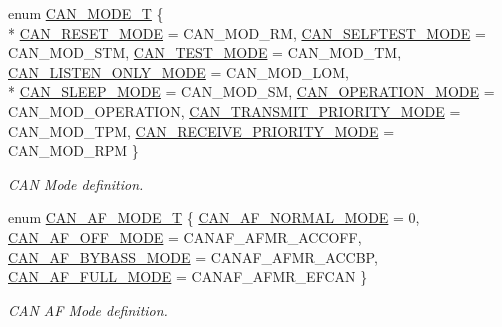 \begin{DoxyCompactItemize}
enum \hyperlink{group__CAN__17XX__40XX_ga57c03b9f9b4ebf86dccc13baf8c2889c}{C\-A\-N\-\_\-\-M\-O\-D\-E\-\_\-\-T} \{ \\*
\hyperlink{group__CAN__17XX__40XX_gga57c03b9f9b4ebf86dccc13baf8c2889ca398cd9777634ece5fcbab4df3cf3a526}{C\-A\-N\-\_\-\-R\-E\-S\-E\-T\-\_\-\-M\-O\-D\-E} = C\-A\-N\-\_\-\-M\-O\-D\-\_\-\-R\-M, 
\hyperlink{group__CAN__17XX__40XX_gga57c03b9f9b4ebf86dccc13baf8c2889cabdca353874fc8859b6d8d84fc8650b51}{C\-A\-N\-\_\-\-S\-E\-L\-F\-T\-E\-S\-T\-\_\-\-M\-O\-D\-E} = C\-A\-N\-\_\-\-M\-O\-D\-\_\-\-S\-T\-M, 
\hyperlink{group__CAN__17XX__40XX_gga57c03b9f9b4ebf86dccc13baf8c2889ca7a621122f70de0ed611cee6827ad05c9}{C\-A\-N\-\_\-\-T\-E\-S\-T\-\_\-\-M\-O\-D\-E} = C\-A\-N\-\_\-\-M\-O\-D\-\_\-\-T\-M, 
\hyperlink{group__CAN__17XX__40XX_gga57c03b9f9b4ebf86dccc13baf8c2889ca26235b6e55aa176156126830508fcf77}{C\-A\-N\-\_\-\-L\-I\-S\-T\-E\-N\-\_\-\-O\-N\-L\-Y\-\_\-\-M\-O\-D\-E} = C\-A\-N\-\_\-\-M\-O\-D\-\_\-\-L\-O\-M, 
\\*
\hyperlink{group__CAN__17XX__40XX_gga57c03b9f9b4ebf86dccc13baf8c2889cad4b949fba84b06206011287e25a69480}{C\-A\-N\-\_\-\-S\-L\-E\-E\-P\-\_\-\-M\-O\-D\-E} = C\-A\-N\-\_\-\-M\-O\-D\-\_\-\-S\-M, 
\hyperlink{group__CAN__17XX__40XX_gga57c03b9f9b4ebf86dccc13baf8c2889ca48f5ffda42c1bd17d9fcb26900b1ced6}{C\-A\-N\-\_\-\-O\-P\-E\-R\-A\-T\-I\-O\-N\-\_\-\-M\-O\-D\-E} = C\-A\-N\-\_\-\-M\-O\-D\-\_\-\-O\-P\-E\-R\-A\-T\-I\-O\-N, 
\hyperlink{group__CAN__17XX__40XX_gga57c03b9f9b4ebf86dccc13baf8c2889cab20dd6c22d6383a3957083cd10d9b80d}{C\-A\-N\-\_\-\-T\-R\-A\-N\-S\-M\-I\-T\-\_\-\-P\-R\-I\-O\-R\-I\-T\-Y\-\_\-\-M\-O\-D\-E} = C\-A\-N\-\_\-\-M\-O\-D\-\_\-\-T\-P\-M, 
\hyperlink{group__CAN__17XX__40XX_gga57c03b9f9b4ebf86dccc13baf8c2889ca962f843f0fbf8d8d8a79b12727742e08}{C\-A\-N\-\_\-\-R\-E\-C\-E\-I\-V\-E\-\_\-\-P\-R\-I\-O\-R\-I\-T\-Y\-\_\-\-M\-O\-D\-E} = C\-A\-N\-\_\-\-M\-O\-D\-\_\-\-R\-P\-M
 \}
\begin{DoxyCompactList}\small\item\em C\-A\-N Mode definition. \end{DoxyCompactList}\item 
enum \hyperlink{group__CAN__17XX__40XX_gaf9abd01ef9ba38a2113a240871e9b48a}{C\-A\-N\-\_\-\-A\-F\-\_\-\-M\-O\-D\-E\-\_\-\-T} \{ \hyperlink{group__CAN__17XX__40XX_ggaf9abd01ef9ba38a2113a240871e9b48aa62b523726ff5237efa0e7fad638a5f04}{C\-A\-N\-\_\-\-A\-F\-\_\-\-N\-O\-R\-M\-A\-L\-\_\-\-M\-O\-D\-E} = 0, 
\hyperlink{group__CAN__17XX__40XX_ggaf9abd01ef9ba38a2113a240871e9b48aaecb73e4da7841519d8e59677d44e47cd}{C\-A\-N\-\_\-\-A\-F\-\_\-\-O\-F\-F\-\_\-\-M\-O\-D\-E} = C\-A\-N\-A\-F\-\_\-\-A\-F\-M\-R\-\_\-\-A\-C\-C\-O\-F\-F, 
\hyperlink{group__CAN__17XX__40XX_ggaf9abd01ef9ba38a2113a240871e9b48aa388c6b86ae9a41adbcdfb801401a9854}{C\-A\-N\-\_\-\-A\-F\-\_\-\-B\-Y\-B\-A\-S\-S\-\_\-\-M\-O\-D\-E} = C\-A\-N\-A\-F\-\_\-\-A\-F\-M\-R\-\_\-\-A\-C\-C\-B\-P, 
\hyperlink{group__CAN__17XX__40XX_ggaf9abd01ef9ba38a2113a240871e9b48aaaf64e87c0a985f362b46284932e44b45}{C\-A\-N\-\_\-\-A\-F\-\_\-\-F\-U\-L\-L\-\_\-\-M\-O\-D\-E} = C\-A\-N\-A\-F\-\_\-\-A\-F\-M\-R\-\_\-\-E\-F\-C\-A\-N
 \}
\begin{DoxyCompactList}\small\item\em C\-A\-N A\-F Mode definition. \end{DoxyCompactList}\end{DoxyCompactItemize}

